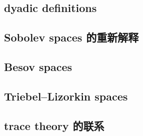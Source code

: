 

\subsection{dyadic definitions}
\label{b2:subsec:190501}

\subsection{Sobolev spaces 的重新解释}
\label{b2:subsec:190502}

\subsection{Besov spaces}
\label{b2:subsec:190503}

\subsection{Triebel–Lizorkin spaces}
\label{b2:subsec:190504}

\subsection{trace theory 的联系}
\label{b2:subsec:190505}


